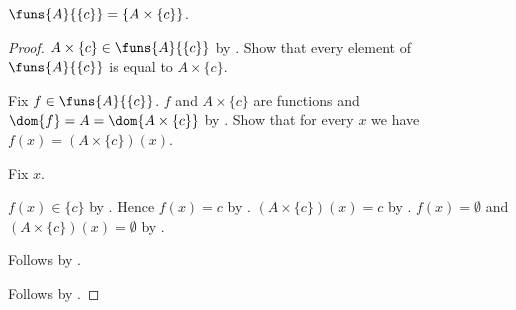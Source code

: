 \begin{proposition}\label{singleton_codom_function_space}
    $\funs{A}{\{c\}}=\{A\times\{c\}\}$.
\end{proposition}
\begin{proof}
    $A\times\{c\}\in\funs{A}{\{c\}}$
        by .
    Show that every element of $\funs{A}{\{c\}}$ is equal to
        $A\times\{c\}$.
    \begin{subproof}
        Fix $f\in\funs{A}{\{c\}}$.
        $f$ and $A\times\{c\}$ are functions and
            $\dom{f}=A=\dom{A\times\{c\}}$
            by
            .
        Show that for every $x$ we have $f(x)=(A\times\{c\})(x)$.
        \begin{subproof}
            Fix $x$.
            \begin{byCase}
                    $f(x)\in\{c\}$ by .
                    Hence $f(x)=c$ by .
                    $(A\times\{c\})(x)=c$
                        by .
                    $f(x)=\emptyset$ and
                        $(A\times\{c\})(x)=\emptyset$
                        by .
            \end{byCase}
        \end{subproof}
        Follows by .
    \end{subproof}
    Follows by .
\end{proof}

